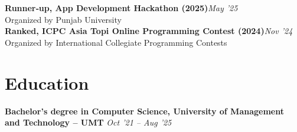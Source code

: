 \documentclass[10pt, letterpaper]{article}
\newcommand{\awardrow}[3]{%
  \noindent\textbf{#1}\hfill{\small\color{lightgray}\textit{#3}}\\
  {\small\color{lightgray}#2}\\[4pt]}
\begin{document}
\awardrow{Runner‑up, App Development Hackathon (2025)}{Organized by Punjab University}{May '25}
\awardrow{Ranked, ICPC Asia Topi Online Programming Contest (2024)}{Organized by International Collegiate Programming Contests}{Nov '24}

\section{Education}

\noindent\textbf{Bachelor's degree in Computer Science, University of Management and Technology -- UMT}
\hfill{\small\color{lightgray}\textit{Oct '21 -- Aug '25}}
\end{document}
